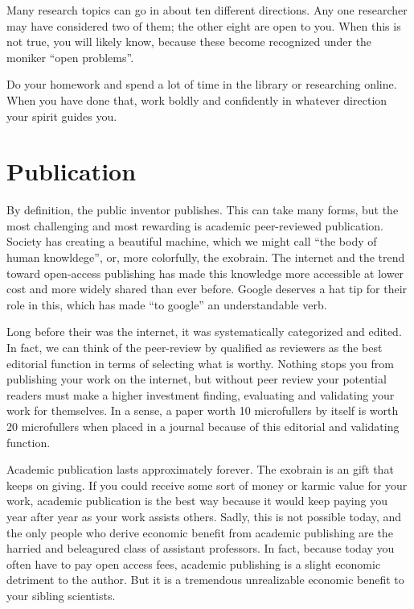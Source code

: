 \documentclass[
	fontsize=10pt, %
	twoside=false, %
	secnumdepth=1, %
]{kaobook}
\begin{document}
Many research topics can go in about ten different directions. Any one
researcher may have considered two of them; the other eight are open
to you. When this is not true, you will likely know, because these
become recognized under the moniker “open problems”.

Do your homework and spend a lot of time in the library or researching
online. When you have done that, work boldly and confidently in
whatever direction your spirit guides you.

\section{Publication}

By definition, the public inventor publishes.
This can take many forms, but the most challenging and most rewarding
is academic peer-reviewed publication.
Society has creating a beautiful machine, which we might
call ``the body of human knowldege'', or, more colorfully, the exobrain.
The internet and the trend toward open-access publishing has made this
knowledge more accessible at lower cost and more widely shared
than ever before.
Google deserves a hat tip for their role in this, which has made
``to google'' an understandable verb.

Long before their was the internet, it was systematically categorized
and edited. In fact, we can think of the peer-review by qualified as
reviewers as the best editorial function in terms of selecting what
is worthy.
Nothing stops you from publishing your work on the internet, but
without peer review your potential readers must make a higher investment
finding, evaluating and validating your work for themselves.
In a sense, a paper worth 10 microfullers by itself is worth
20 microfullers when placed in a journal because of this
editorial and validating function.

Academic publication lasts approximately forever.
The exobrain is an gift that keeps on giving.
If you could receive some sort of money or karmic value
for your work, academic publication is the best way
because it would keep paying you year after year as
your work assists others. Sadly, this is not possible
today, and the only people who derive economic benefit
from academic publishing are the harried and beleagured class of assistant professors.
In fact, because today you often have to pay open access fees, academic
publishing is a slight economic detriment to the author.
But it is a tremendous unrealizable economic benefit to your
sibling scientists.
\end{document}
